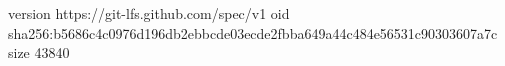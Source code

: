 version https://git-lfs.github.com/spec/v1
oid sha256:b5686c4c0976d196db2ebbcde03ecde2fbba649a44c484e56531c90303607a7c
size 43840
